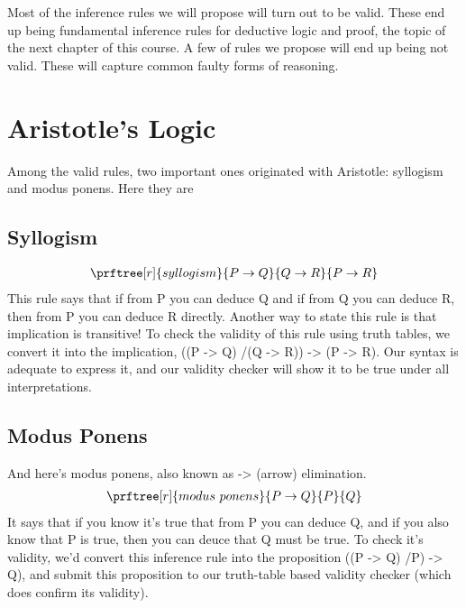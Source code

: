 \documentclass[letterpaper,10pt,english]{sphinxmanual}
\begin{document}
Most of the inference rules we will propose will turn out to be valid.
These end up being fundamental inference rules for deductive logic and
proof, the topic of the next chapter of this course. A few of rules we
propose will end up being not valid. These will capture common faulty
forms of reasoning.


\section{Aristotle’s Logic}
\label{\detokenize{13-consequence:aristotle-s-logic}}
Among the valid rules, two important ones originated with Aristotle:
syllogism and modus ponens. Here they are


\subsection{Syllogism}
\label{\detokenize{13-consequence:syllogism}}\begin{equation*}
\begin{split}\prftree[r]{syllogism}{P \rightarrow Q}{Q \rightarrow R}{P \rightarrow R}\end{split}
\end{equation*}
This rule says that if from P you can deduce Q and if from Q you can
deduce R, then from P you can deduce R directly. Another way to state
this rule is that implication is transitive! To check the validity of
this rule using truth tables, we convert it into the implication, ((P
-\textgreater{} Q) /(Q -\textgreater{} R)) -\textgreater{} (P -\textgreater{} R). Our syntax is adequate to express it,
and our validity checker will show it to be true under all
interpretations.


\subsection{Modus Ponens}
\label{\detokenize{13-consequence:modus-ponens}}
And here’s modus ponens, also known as -\textgreater{} (arrow) elimination.
\begin{equation*}
\begin{split}\prftree[r]{modus\ ponens}{P \rightarrow Q}{P}{Q}\end{split}
\end{equation*}
It says that if you know it’s true that from P you can deduce Q, and
if you also know that P is true, then you can deuce that Q must be
true. To check it’s validity, we’d convert this inference rule into
the proposition ((P -\textgreater{} Q) /P) -\textgreater{} Q), and submit this proposition to
our truth-table based validity checker (which does confirm its
validity).
\end{document}
